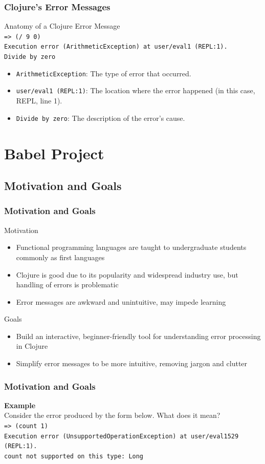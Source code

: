 \documentclass{beamer}
\begin{document}
\begin{frame}
    \frametitle{Clojure's Error Messages}
    Anatomy of a Clojure Error Message \\
    \texttt{=> (/ 9 0)} \\
    \texttt{Execution error (ArithmeticException) at user/eval1 (REPL:1).} \\
    \texttt{Divide by zero}
    \begin{itemize}
      \item \texttt{ArithmeticException}: The type of error that occurred.
      \item \texttt{user/eval1 (REPL:1)}: The location where the error happened (in this case, REPL, line 1).
      \item \texttt{Divide by zero}: The description of the error's cause.
    \end{itemize}
\end{frame}

\section{Babel Project}
\subsection{Motivation and Goals}

\begin{frame}
    \frametitle{Motivation and Goals}
    Motivation
    \begin{itemize}
        \item Functional programming languages are taught to undergraduate students commonly as first languages
        \item Clojure is good due to its popularity and widespread industry use, but handling of errors is problematic
        \item Error messages are awkward and unintuitive, may impede learning
    \end{itemize}
    Goals
    \begin{itemize}
        \item Build an interactive, beginner-friendly tool for understanding error processing in Clojure
        \item Simplify error messages to be more intuitive, removing jargon and clutter
    \end{itemize}
\end{frame}

\begin{frame}
    \frametitle{Motivation and Goals}
    \textbf{Example} \\
    Consider the error produced by the form below. What does it mean? \\
    \texttt{=> (count 1)} \\
    \texttt{Execution error (UnsupportedOperationException) at user/eval1529 (REPL:1).} \\
    \texttt{count not supported on this type: Long} \\
\end{frame}
\end{document}
